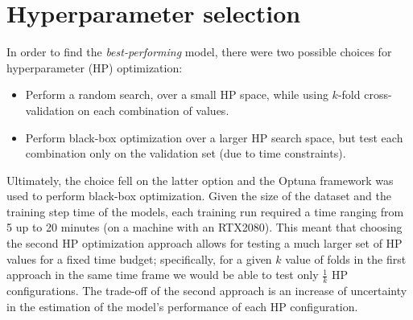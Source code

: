 
\section{Hyperparameter selection} %
In order to find the \textit{best-performing} model, there were two possible choices for hyperparameter (HP) optimization: 
\begin{itemize}
    \item Perform a random search, over a small HP space, while using $k$-fold cross-validation on each combination of values.
    \item Perform black-box optimization over a larger HP search space, but test each combination only on the validation set (due to time constraints).
\end{itemize}

\noindent
Ultimately, the choice fell on the latter option and the Optuna \cite{akiba2019optuna} framework was used to perform black-box optimization. Given the size of the dataset and the training step time of the models, each training run required a time ranging from 5 up to 20 minutes (on a machine with an RTX2080). This meant that choosing the second HP optimization approach allows for testing a much larger set of HP values for a fixed time budget; specifically, for a given $k$ value of folds in the first approach in the same time frame we would be able to test only $\frac{1}{k}$ HP configurations. The trade-off of the second approach is an increase of uncertainty in the estimation of the model's performance of each HP configuration.\\


